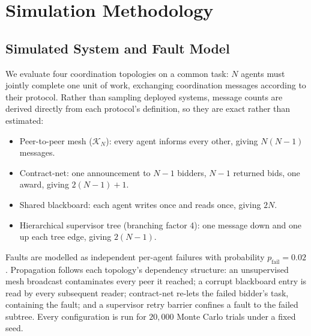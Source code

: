 \documentclass[10pt,twocolumn,letterpaper]{article}
\begin{document}
\section{Simulation Methodology}



\subsection{Simulated System and Fault Model}


We evaluate four coordination topologies on a common task: $N$ agents must jointly complete one unit of work, exchanging coordination messages according to their protocol. Rather than sampling deployed systems, message counts are derived directly from each protocol's definition, so they are exact rather than estimated:

\begin{itemize}
  \item Peer-to-peer mesh ($\mathcal{K}_N$): every agent informs every other, giving $N(N-1)$ messages.
  \item Contract-net: one announcement to $N-1$ bidders, $N-1$ returned bids, one award, giving $2(N-1)+1$.
  \item Shared blackboard: each agent writes once and reads once, giving $2N$.
  \item Hierarchical supervisor tree (branching factor 4): one message down and one up each tree edge, giving $2(N-1)$.
\end{itemize}

Faults are modelled as independent per-agent failures with probability $p_{\text{fail}} = 0.02$. Propagation follows each topology's dependency structure: an unsupervised mesh broadcast contaminates every peer it reached; a corrupt blackboard entry is read by every subsequent reader; contract-net re-lets the failed bidder's task, containing the fault; and a supervisor retry barrier confines a fault to the failed subtree. Every configuration is run for $20{,}000$ Monte Carlo trials under a fixed seed.
\end{document}
